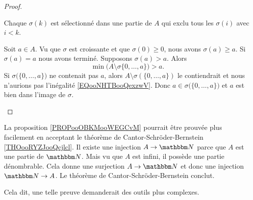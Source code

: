 \begin{proof}
\begin{subproof}
        \item[Elle est injective]
            Chaque \( \sigma(k)\) est sélectionné dans une partie de \( A\) qui exclu tous les \( \sigma(i)\) avec \( i<k\).
        \item[Elle est surjective]
            Soit \( a\in A\). Vu que \( \sigma\) est croissante et que \( \sigma(0)\geq 0\), nous avons \( \sigma(a)\geq a\). Si \( \sigma(a)=a\) nous avons terminé. Supposons \( \sigma(a)>a\). Alors
            \begin{equation}        \label{EQooNHTBooQexzwV}
                \min\big( A\setminus\sigma\{ 0,\ldots, a \} \big)>a.
            \end{equation}
            Si \( \sigma\big( \{ 0,\ldots, a \} \big)\) ne contenait pas \( a\), alors \( A\setminus \sigma(\{ 0,\ldots, a \})\) le contiendrait et nous n'aurions pas l'inégalité \eqref{EQooNHTBooQexzwV}. Donc \( a\in \sigma\big( \{ 0,\ldots, a \} \big)\) et \( a\) est bien dans l'image de \( \sigma\).
    \end{subproof}
\end{proof}

\begin{normaltext}
    La proposition \ref{PROPooOBKMooWEGCvM} pourrait être prouvée plus facilement en acceptant le théorème de Cantor-Schröder-Bernstein \ref{THOooRYZJooQcjlcl}. Il existe une injection \( A\to \eN\) parce que \( A\) est une partie de \( \eN\). Mais vu que \( A\) est infini, il possède une partie dénombrable. Cela donne une surjection \( A\to \eN\) et donc une injection \( \eN\to A\). Le théorème de Cantor-Schröder-Bernstein conclut.

    Cela dit, une telle preuve demanderait des outils plus complexes.
\end{normaltext}


